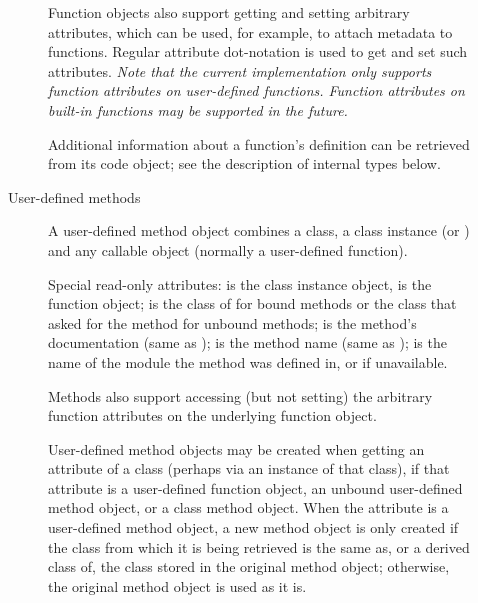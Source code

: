 \begin{description}
\begin{description}

Function objects also support getting and setting arbitrary
attributes, which can be used, for example, to attach metadata to
functions.  Regular attribute dot-notation is used to get and set such
attributes. \emph{Note that the current implementation only supports
function attributes on user-defined functions.  Function attributes on
built-in functions may be supported in the future.}

Additional information about a function's definition can be retrieved
from its code object; see the description of internal types below.


\item[User-defined methods]
A user-defined method object combines a class, a class instance (or
) and any callable object (normally a user-defined
function).

Special read-only attributes:  is the class instance
object,  is the function object;
 is the class of  for bound methods
or the class that asked for the method for unbound methods;
 is the method's documentation (same as
);  is the method name (same as
);  is the name of the
module the method was defined in, or  if unavailable.

Methods also support accessing (but not setting) the arbitrary
function attributes on the underlying function object.

User-defined method objects may be created when getting an attribute
of a class (perhaps via an instance of that class), if that attribute
is a user-defined function object, an unbound user-defined method object,
or a class method object.
When the attribute is a user-defined method object, a new
method object is only created if the class from which it is being
retrieved is the same as, or a derived class of, the class stored
in the original method object; otherwise, the original method object
is used as it is.


\end{description}
\end{description}
